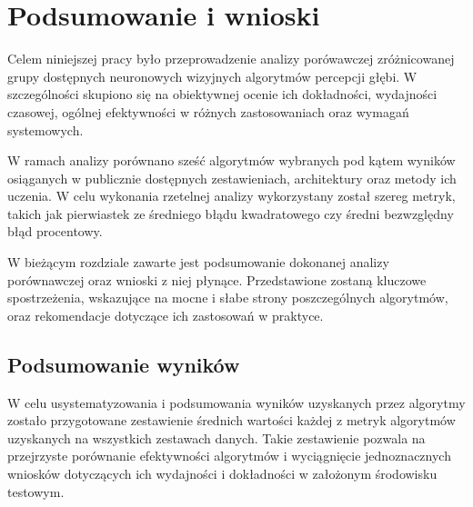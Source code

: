 \chapter{Podsumowanie i wnioski}\label{chap:podsumowanie_i_wnioski}
Celem niniejszej pracy było przeprowadzenie analizy porówawczej zróżnicowanej grupy dostępnych neuronowych wizyjnych algorytmów percepcji głębi. W szczególności skupiono się na obiektywnej ocenie ich dokładności, wydajności czasowej, ogólnej efektywności w różnych zastosowaniach oraz wymagań systemowych.

W ramach analizy porównano sześć algorytmów wybranych pod kątem wyników osiąganych w publicznie dostępnych zestawieniach, architektury oraz metody ich uczenia. W celu wykonania rzetelnej analizy wykorzystany został szereg metryk, takich jak pierwiastek ze średniego błądu kwadratowego czy średni bezwzględny błąd procentowy.

W bieżącym rozdziale zawarte jest podsumowanie dokonanej analizy porównawczej oraz wnioski z niej płynące. Przedstawione zostaną kluczowe spostrzeżenia, wskazujące na mocne i słabe strony poszczególnych algorytmów, oraz rekomendacje dotyczące ich zastosowań w praktyce.

\section{Podsumowanie wyników}
W celu usystematyzowania i podsumowania wyników uzyskanych przez algorytmy zostało przygotowane zestawienie średnich wartości każdej z metryk algorytmów uzyskanych na wszystkich zestawach danych. Takie zestawienie pozwala na przejrzyste porównanie efektywności algorytmów i wyciągnięcie jednoznacznych wniosków dotyczących ich wydajności i dokładności w założonym środowisku testowym.

